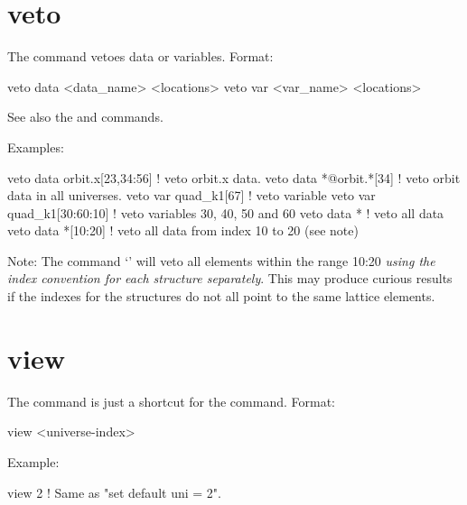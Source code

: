 {{{{{{{{{{{{%

\section{veto}
\label{s:veto}

The  command vetoes data or variables. Format:
\begin{example}
  veto data <data_name> <locations>
  veto var <var_name> <locations>
\end{example}

\vskip 7pt 

See also the  and  commands.

Examples:
\begin{example}
  veto data orbit.x[23,34:56]  ! veto orbit.x data.
  veto data *@orbit.*[34]      ! veto orbit data in all universes.
  veto var quad_k1[67]         ! veto variable
  veto var quad_k1[30:60:10]   ! veto variables 30, 40, 50 and 60
  veto data *                  ! veto all data
  veto data *[10:20]           ! veto all data from index 10 to 20 (see note)
\end{example}

Note: The command `' will veto all  elements within the range
10:20 \textit{using the index convention for each  structure separately}. This may produce
curious results if the indexes for the  structures do not all point to the same lattice
elements.


\section{view}
\label{s:view}

The  command is just a shortcut for the  command. Format:
\begin{example}
  view <universe-index>
\end{example}

Example:
\begin{example}
  view 2   ! Same as "set default uni = 2".
\end{example}


}}}}}}}}}}}}
